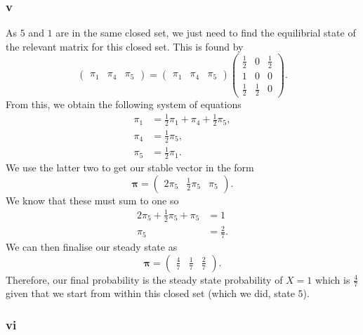 \documentclass{article}
\begin{document}
\subsubsection{v}
As $5$ and $1$ are in the same closed set, we just need to find the equilibrial state of the relevant matrix for this closed set. This is found by
\begin{equation}
    \begin{pmatrix}
        \pi_1 & \pi_4 & \pi_5
    \end{pmatrix} = \begin{pmatrix}
        \pi_1 & \pi_4 & \pi_5
    \end{pmatrix}\begin{pmatrix}
        \frac{1}{2} & 0 & \frac{1}{2} \\
        1 & 0 & 0 \\
        \frac{1}{2} & \frac{1}{2} & 0
    \end{pmatrix}.
\end{equation}
From this, we obtain the following system of equations
\begin{align}
    \pi_1 &= \frac{1}{2}\pi_1 + \pi_4 + \frac{1}{2}\pi_5, \\
    \pi_4 &= \frac{1}{2}\pi_5,\\ 
    \pi_5 &= \frac{1}{2}\pi_1.
\end{align}
We use the latter two to get our stable vector in the form
\begin{equation}
    \boldsymbol{\pi} = \begin{pmatrix}
        2\pi_5 & \frac{1}{2}\pi_5 & \pi_5
    \end{pmatrix}.
\end{equation}
We know that these must sum to one so
\begin{align}
    2\pi_5 + \frac{1}{2}\pi_5 + \pi_5 &= 1 \\
    \pi_5 &= \frac{2}{7}.
\end{align}
We can then finalise our steady state as 
\begin{equation}
    \boldsymbol{\pi} = \begin{pmatrix}
        \frac{4}{7} & \frac{1}{7} & \frac{2}{7}
    \end{pmatrix}.
\end{equation}
Therefore, our final probability is the steady state probability of $X=1$ which is $\frac{4}{7}$ given that we start from within this closed set (which we did, state $5$).

\subsubsection{vi}
\end{document}
